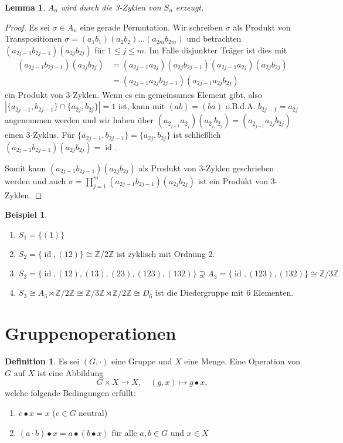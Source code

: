 \documentclass[12pt]{scrartcl} %
\DeclareMathOperator{\id}{id}
\newcommand\Z{\mathbb{Z}}
\newtheorem{lemma}[thm]{Lemma}
\theoremstyle{definition}
\newtheorem*{defn}{Definition}
\newtheorem{ex}{Beispiel}
\theoremstyle{remark}
\begin{document}
\begin{lemma}
	$A_n$ wird durch die 3-Zyklen von $S_n$ erzeugt.
\end{lemma}
	
\begin{proof}
	Es sei $\sigma \in A_n$ eine gerade Permutation.
	Wir schreiben $\sigma$ als Produkt von Transpositionen $\sigma =(a_1b_1)(a_2b_2)\dots(a_{2m}b_{2m})$ und betrachten \((a_{2j-1}b_{2j-1})(a_{2j}b_{2j})\) für \(1 \leq j \leq m\).
	Im Falle disjunkter Träger ist dies mit
	\begin{align*}
		(a_{2j-1}b_{2j-1})(a_{2j}b_{2j}) &= (a_{2j-1}a_{2j})(a_{2j}b_{2j-1})(a_{2j-1}a_{2j})(a_{2j}b_{2j})\\
		&= (a_{2j-1}a_{2j}b_{2j-1})(a_{2j-1}a_{2j}b_{2j})
	\end{align*}
	ein Produkt von 3-Zyklen.
	Wenn es ein gemeinsames Element gibt, also \(|\{a_{2j-1},b_{2j-1}\} \cap \{a_{2j},b_{2j}\}| = 1\) ist, kann mit \((ab) = (ba)\) o.B.d.A. $b_{2j-1}=a_{2j}$ angenommen werden und wir haben über $(a_{2_{j-1}}a_{2_j})(a_{2_j}b_{2_j})=(a_{2_{j-1}}a_{2j}b_{2j})$ einen 3-Zyklus.
	Für \(\{a_{2j-1},b_{2j-1}\} = \{a_{2j},b_{2j}\}\) ist schließlich \((a_{2j-1}b_{2j-1})(a_{2j}b_{2j}) = \id\).

	Somit kann \((a_{2j-1}b_{2j-1})(a_{2j}b_{2j})\) als Produkt von 3-Zyklen geschrieben werden und auch \(\sigma = \prod_{j = 1}^m (a_{2j-1}b_{2j-1})(a_{2j}b_{2j})\) ist ein Produkt von 3-Zyklen.
\end{proof}
	
\begin{ex}
	\begin{enumerate}
	\item $S_1 = \{(1)\}$
	\item $S_2 = \{\id, (12)\} \cong \Z/2\Z$ ist zyklisch mit Ordnung \(2\).
	\item $S_3 = \{\id, (12), (13), (23), (123), (132)\} \supsetneq A_3=\{\id, (123), (132)\} \cong \Z/3\Z$
	\item $S_3 \cong A_3\rtimes \mathbb{Z}/2\mathbb{Z} \cong \mathbb{Z}/3\mathbb{Z} \rtimes \mathbb{Z}/2\mathbb{Z} \cong D_6$ ist die Diedergruppe mit 6 Elementen.
	\end{enumerate}
\end{ex}
	 
\section{Gruppenoperationen}

\begin{defn}
	Es sei $(G, \cdot)$ eine Gruppe und $X$ eine Menge.
	Eine Operation von \(G\) auf \(X\) ist eine Abbildung
	$$G \times X \rightarrow X, \quad (g,x) \mapsto g\bullet x,$$
	welche folgende Bedingungen erfüllt:
	\begin{enumerate}
	\item $e \bullet x = x$ ($e\in G$ neutral)
	\item \((a\cdot b)\bullet x = a\bullet (b\bullet x)\) für alle \(a,b\in G\) und \(x\in X\)
	\end{enumerate}
\end{defn}
\end{document}
